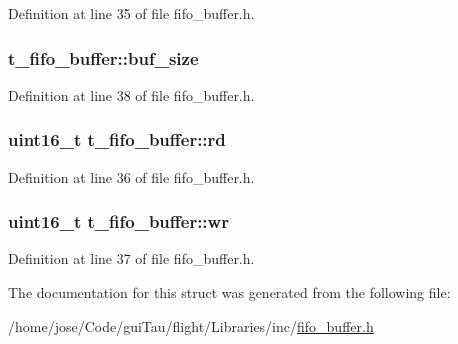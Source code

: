 Definition at line 35 of file fifo\-\_\-buffer.\-h.

\hypertarget{structt__fifo__buffer_a2ffa256dbcc216fcf1300aff50d41c3e}{
\subsubsection[{buf\-\_\-size}]{ t\-\_\-fifo\-\_\-buffer\-::buf\-\_\-size}}\label{structt__fifo__buffer_a2ffa256dbcc216fcf1300aff50d41c3e}


Definition at line 38 of file fifo\-\_\-buffer.\-h.

\hypertarget{structt__fifo__buffer_af64a7e9ffdbe3eea93ad06b891189179}{
\subsubsection[{rd}]{ {\bf uint16\-\_\-t} t\-\_\-fifo\-\_\-buffer\-::rd}}\label{structt__fifo__buffer_af64a7e9ffdbe3eea93ad06b891189179}


Definition at line 36 of file fifo\-\_\-buffer.\-h.

\hypertarget{structt__fifo__buffer_a499ed012a0f43ac65deb1bbbe28689fd}{
\subsubsection[{wr}]{ {\bf uint16\-\_\-t} t\-\_\-fifo\-\_\-buffer\-::wr}}\label{structt__fifo__buffer_a499ed012a0f43ac65deb1bbbe28689fd}


Definition at line 37 of file fifo\-\_\-buffer.\-h.



The documentation for this struct was generated from the following file\-:\begin{DoxyCompactItemize}
\item 
/home/jose/\-Code/gui\-Tau/flight/\-Libraries/inc/\hyperlink{fifo__buffer_8h}{fifo\-\_\-buffer.\-h}\end{DoxyCompactItemize}
